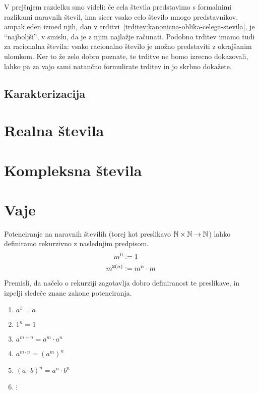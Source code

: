 V prejšnjem razdelku smo videli: če cela števila predstavimo s formalnimi razlikami naravnih števil, ima sicer vsako celo število mnogo predstavnikov, ampak eden izmed njih, dan v trditvi~\ref{trditev:kanonicna-oblika-celega-stevila}, je ``najboljši'', v smislu, da je z njim najlažje računati. Podobno trditev imamo tudi za racionalna števila: vsako racionalno število je možno predstaviti z okrajšanim ulomkom. Ker to že zelo dobro poznate, te trditve ne bomo izrecno dokazovali, lahko pa za vajo sami natančno formulirate trditev in jo skrbno dokažete.

\subsection{Karakterizacija}

\section{Realna števila}
\label{sec:realna-stevila}


\section{Kompleksna števila}



\section{Vaje}

\begin{vaja}
Potenciranje na naravnih številih (torej kot preslikavo $\mathbb{N} \times \mathbb{N} \to \mathbb{N}$) lahko definiramo rekurzivno z naslednjim predpisom.
\begin{align*}
m^0 &\mathrel{\mathop:}= 1 \\
m^{\mathtt{S}(n)} &\mathrel{\mathop:}= m^n \cdot m
\end{align*}
Premisli, da načelo o rekurziji zagotavlja dobro definiranost te preslikave, in izpelji sledeče znane zakone potenciranja.
\begin{enumerate}
\item
$a^1 = a$
\item
$1^n = 1$
\item
$a^{m + n} = a^m \cdot a^n$
\item
$a^{m \cdot n} = (a^m)^n$
\item
$(a \cdot b)^n = a^n \cdot b^n$
\item
$\vdots$
\end{enumerate}
\end{vaja}


